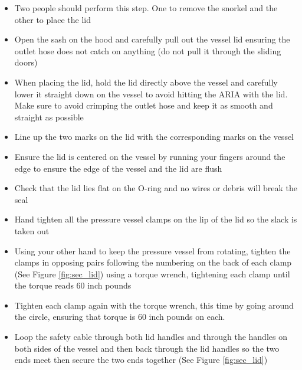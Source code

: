 \documentclass[letterpaper,11pt]{article}
\begin{document}
\begin{enumerate}
        \begin{itemize}
        \item Two people should perform this step. One to remove the snorkel
            and the other to place the lid
        \item Open the sash on the hood and carefully pull out the vessel lid 
            ensuring the outlet 
            hose does not catch on anything (do not pull it through the 
            sliding doors)
        \item When placing the lid, hold the lid directly above the vessel and 
            carefully lower it straight down on the vessel to avoid hitting the
            ARIA with the lid. Make sure to avoid crimping the outlet hose and 
            keep it as smooth and straight as possible
        \item Line up the two marks on the lid with the corresponding marks 
            on the vessel
        \item Ensure the lid is centered on the vessel by running your fingers
            around the edge to ensure the edge of the vessel and the lid are
            flush 
        \item Check that the lid lies flat on the O-ring and no wires or debris 
            will break the seal
        \item Hand tighten all the pressure vessel clamps on the lip of the lid 
            so the slack is taken out
        \item Using your other hand to keep the pressure vessel from rotating, 
			tighten the clamps in opposing pairs following the numbering on 
            the back of each clamp (See Figure \ref{fig:sec_lid}) using a 
            torque wrench, tightening each clamp until the torque reads 
            60 inch pounds
            \item Tighten each clamp again with the torque wrench, this time by 
            going around the circle, ensuring that torque is 60 inch pounds on 
            each.
        \item Loop the safety cable through both lid handles and through the 
            handles on both sides of the vessel and then back through the lid 
            handles so the two ends meet then secure the two ends together 
            (See Figure \ref{fig:sec_lid})


\end{itemize}
\end{enumerate}
\end{document}
